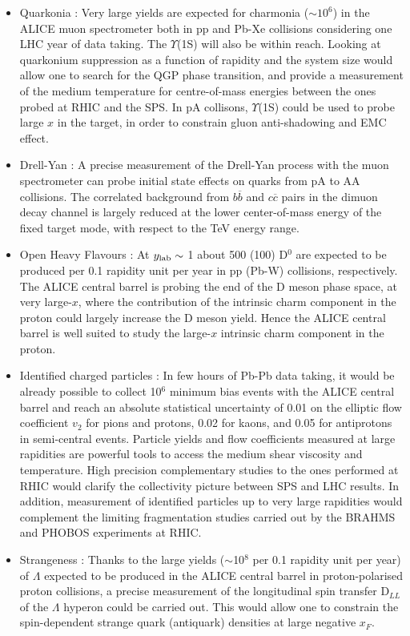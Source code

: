 \documentclass[../report.tex]{subfiles}
\begin{document}
\begin{itemize}
\item{Quarkonia : Very large yields are expected for charmonia ($\sim 10^{6}$) in the ALICE muon spectrometer both in pp and Pb-Xe collisions considering one LHC year of data taking. The $\Upsilon$(1S) will also be within reach. Looking at quarkonium suppression as a function of rapidity and the system size would allow one to search for the QGP phase transition, and provide a measurement of the medium temperature for centre-of-mass energies between the ones probed at RHIC and the SPS. In pA collisons, $\Upsilon$(1S) could be used to probe large $x$ in the target, in order to constrain gluon anti-shadowing and EMC effect.}
\item{Drell-Yan : A precise measurement of the Drell-Yan process with the muon spectrometer can probe initial state effects on quarks from pA to AA collisions. The correlated background from $b\overline{b}$ and $c\overline{c}$ pairs in the dimuon decay channel is largely reduced at the lower center-of-mass energy of the fixed target mode, with respect to the TeV energy range.}
\item{Open Heavy Flavours : At $y_{\rm lab} \sim$ 1 about 500 (100) D$^{0}$ are expected to be produced per 0.1 rapidity unit per year in pp (Pb-W) collisions, respectively. The ALICE central barrel is probing the end of the D meson phase space, at very large-$x$, where the contribution of the intrinsic charm component in the proton could largely increase the D meson yield. Hence the ALICE central barrel is well suited to study the large-$x$ intrinsic charm component in the proton.}
\item{Identified charged particles : In few hours of Pb-Pb data taking, it would be already possible to collect 10$^{6}$ minimum bias events with the ALICE central barrel and reach an absolute statistical uncertainty of 0.01 on the elliptic flow coefficient $v_{2}$ for pions and protons, 0.02 for kaons, and 0.05 for antiprotons in semi-central events. Particle yields and flow coefficients measured at large rapidities are powerful tools to access the medium shear viscosity and temperature. High precision complementary studies to the ones performed at RHIC would clarify the collectivity picture between SPS and LHC results. In addition, measurement of identified particles up to very large rapidities would complement the limiting fragmentation studies carried out by the BRAHMS and PHOBOS experiments at RHIC.} 
\item{Strangeness : Thanks to the large yields ($\sim$10$^{8}$ per 0.1 rapidity unit per year) of $\Lambda$ expected to be produced in the ALICE central barrel in proton-polarised proton collisions, a precise measurement of the longitudinal spin transfer D$_{LL}$ of the $\Lambda$ hyperon could be carried out. This would allow one to constrain the spin-dependent strange quark (antiquark) densities at large negative $x_{F}$.}
\end{itemize}
\end{document}
